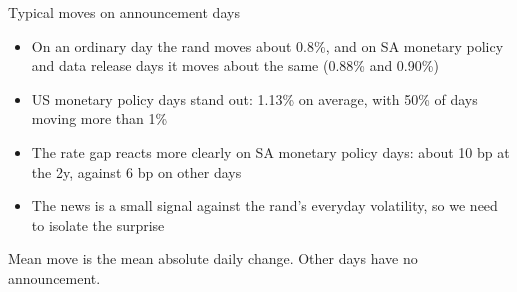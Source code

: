 \documentclass[
  ignorenonframetext,
  aspectratio=141,
]{beamer}
\providecommand{\tightlist}{%
  \setlength{\itemsep}{0pt}\setlength{\parskip}{0pt}}\usepackage{longtable,booktabs,array}
\begin{document}
\begin{frame}{Typical moves on announcement days}
\label{typical-moves-on-announcement-days}
\begin{table}[!h]
\centering\begingroup\fontsize{9}{11}\selectfont

\endgroup{}
\end{table}

\vspace{0.2cm}

\begin{itemize}
\tightlist
\item
  On an ordinary day the rand moves about 0.8\%, and on SA monetary
  policy and data release days it moves about the same (0.88\% and
  0.90\%)
\item
  US monetary policy days stand out: 1.13\% on average, with 50\% of
  days moving more than 1\%
\item
  The rate gap reacts more clearly on SA monetary policy days: about 10
  bp at the 2y, against 6 bp on other days
\item
  The news is a small signal against the rand's everyday volatility, so
  we need to isolate the surprise
\end{itemize}

\footnotesize Mean move is the mean absolute daily change. Other days
have no announcement.
\end{frame}
\end{document}
